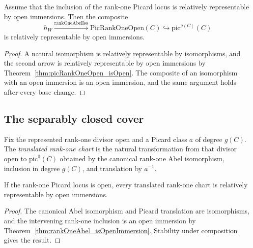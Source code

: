 \begin{theorem}
  \label{thm:rankOneAbel_isOpenImmersion}
  \leanok
  Assume that the inclusion of the rank-one Picard locus is relatively representable by
  open immersions.  Then the composite
  \[
    h_W\xrightarrow{\operatorname{rankOneAbelIso}}
    \mathrm{PicRankOneOpen}(C)\hookrightarrow\mathrm{pic}^{g(C)}(C)
  \]
  is relatively representable by open immersions.
\end{theorem}
\begin{proof}
  \leanok
  A natural isomorphism is relatively representable by isomorphisms, and the second arrow is
  relatively representable by open immersions by
  Theorem~\ref{thm:picRankOneOpen_isOpen}.  The composite of an isomorphism with an open
  immersion is an open immersion, and the same argument holds after every base change.
\end{proof}

\subsection{The separably closed cover}

\begin{definition}
  \label{def:pic0TranslatedRankOneOpen}
  \leanok
  Fix the represented rank-one divisor open and a Picard class \(a\) of degree \(g(C)\).
  The \emph{translated rank-one chart} is the natural transformation from that divisor open
  to \(\mathrm{pic}^0(C)\) obtained by the canonical rank-one Abel isomorphism, inclusion in
  degree \(g(C)\), and translation by \(a^{-1}\).
\end{definition}

\begin{theorem}
  \label{thm:pic0TranslatedRankOneOpen_representable}
  \leanok
  If the rank-one Picard locus is open, every translated rank-one chart is relatively
  representable by open immersions.
\end{theorem}
\begin{proof}
  \leanok
  The canonical Abel isomorphism and Picard translation are isomorphisms, and the intervening
  rank-one inclusion is an open immersion by
  Theorem~\ref{thm:rankOneAbel_isOpenImmersion}.  Stability under composition gives the
  result.
\end{proof}

